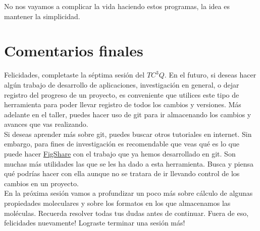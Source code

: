 \documentclass[10pt,letterpaper]{article}
\begin{document}
No nos vayamos a complicar la vida haciendo estos programas, la idea es mantener la simplicidad. 

\section{Comentarios finales}
Felicidades, completaste la s\'eptima sesi\'on del $TC^3 Q$. En el futuro, si deseas hacer alg\'un trabajo de desarrollo de aplicaciones, investigaci\'on en general, o dejar registro del progreso de un proyecto, es conveniente que utilices este tipo de herramienta para poder llevar registro de todos los cambios y versiones. M\'as adelante en el taller, puedes hacer uso de git para ir almacenando los cambios y avances que vas realizando.\\

Si deseas aprender m\'as sobre git, puedes buscar otros tutoriales en internet. Sin embargo, para fines de investigaci\'on es recomendable que veas qu\'e es lo que puede hacer \href{http://figshare.org/}{FigShare} con el trabajo que ya hemos desarrollado en git. Son muchas m\'as utilidades las que se les ha dado a esta herramienta. Busca y piensa qu\'e podr\'ias hacer con ella aunque no se tratara de ir llevando control de los cambios en un proyecto.\\

En la pr\'oxima sesi\'on vamos a profundizar un poco m\'as sobre c\'alculo de algunas propiedades moleculares y sobre los formatos en los que almacenamos las mol\'eculas. Recuerda resolver todas tus dudas antes de continuar. Fuera de eso, felicidades nuevamente! Lograste terminar una sesi\'on m\'as!
\end{document}
